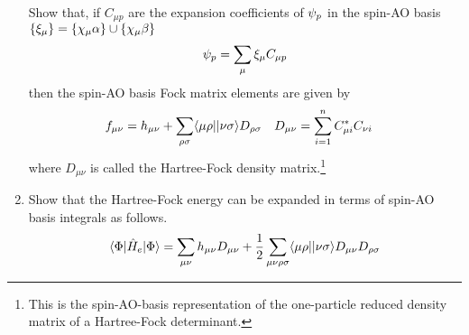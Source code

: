\documentclass[fleqn,12pt]{article}
\begin{document}
\begin{enumerate}
  Show that, if $C_{\mu p}$ are the expansion coefficients of $\psi_p$ in the spin-AO basis $\{\xi_\mu\}=\{\chi_\mu\alpha\}\cup\{\chi_\mu\beta\}$
\begin{align}
  \psi_p
=
  \sum_\mu \xi_\mu C_{\mu p}
\end{align}
  then the spin-AO basis Fock matrix elements are given by
\begin{align}
&
  f_{\mu\nu}
=
  h_{\mu\nu}
+
  \sum_{\rho\sigma}
  \langle\mu\rho||\nu\sigma\rangle D_{\rho\sigma}
&&
  D_{\mu\nu}
=
  \sum_{i=1}^n
  C_{\mu i}^*C_{\nu i}
\end{align}
  where $D_{\mu\nu}$ is called the Hartree-Fock density matrix.\footnote{This is the spin-AO-basis representation of the one-particle reduced density matrix of a Hartree-Fock determinant.}
\item Show that the Hartree-Fock energy can be expanded in terms of spin-AO basis integrals as follows.
\begin{align}
  \langle\Phi|\hat{H}_e|\Phi\rangle
=
  \sum_{\mu\nu}
  h_{\mu\nu}D_{\mu\nu}
+
  \dfrac{1}{2}
  \sum_{\mu\nu\rho\sigma}
  \langle\mu\rho||\nu\sigma\rangle
  D_{\mu\nu}D_{\rho\sigma}
\end{align}
\end{enumerate}
\end{document}
